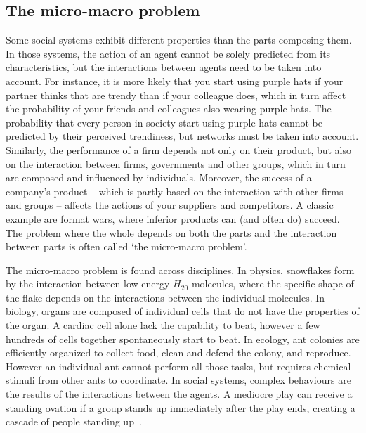 \subsection{The micro-macro problem}
Some social systems exhibit different properties than the parts composing them.
In those systems, the action of an agent cannot be solely predicted from its characteristics, 
but the interactions between agents need to be taken into account. 
For instance, it is more likely that you start using purple hats if your partner thinks that are trendy than if your colleague does,
which in turn affect the probability of your friends and colleagues also wearing purple hats.
The probability that every person in society start using purple hats cannot be predicted by their perceived trendiness, 
but networks must be taken into account.
Similarly, the performance of a firm depends not only on their product,
but also on the interaction between firms, governments and other groups, 
which in turn are composed and influenced by individuals.
Moreover, the success of a company's product 
-- which is partly based on the interaction with other firms and groups -- 
affects the actions of your suppliers and competitors.
A classic example are format wars,
where inferior products can (and often do) succeed.
The problem where the whole depends on both the parts and the interaction between parts is often called `the micro-macro problem'.

The micro-macro problem is found across disciplines. 
In physics, snowflakes form by the interaction between low-energy $H_20$ molecules, 
where the specific shape of the flake depends on the interactions between the individual molecules.
In biology, organs are composed of individual cells that do not have the properties of the organ. 
A cardiac cell alone lack the capability to beat, however a few hundreds of cells together spontaneously start to beat.
In ecology, ant colonies are efficiently organized to collect food, clean and defend the colony, and reproduce. 
However an individual ant cannot perform all those tasks, 
but requires chemical stimuli from other ants to coordinate.
In social systems, complex behaviours are the results of the interactions between the agents. 
A mediocre play can receive a standing ovation if a group stands up immediately after the play ends, 
creating a cascade of people standing up~\citep{miller2004}. 

